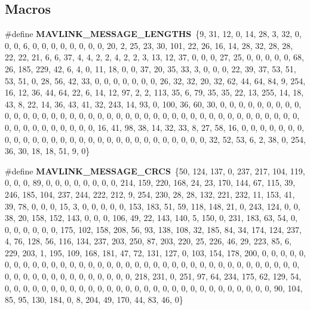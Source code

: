 \subsection*{Macros}
\begin{DoxyCompactItemize}
\item 
\#define \textbf{ M\+A\+V\+L\+I\+N\+K\+\_\+\+M\+E\+S\+S\+A\+G\+E\+\_\+\+L\+E\+N\+G\+T\+HS}~\{9, 31, 12, 0, 14, 28, 3, 32, 0, 0, 0, 6, 0, 0, 0, 0, 0, 0, 0, 0, 20, 2, 25, 23, 30, 101, 22, 26, 16, 14, 28, 32, 28, 28, 22, 22, 21, 6, 6, 37, 4, 4, 2, 2, 4, 2, 2, 3, 13, 12, 37, 0, 0, 0, 27, 25, 0, 0, 0, 0, 0, 68, 26, 185, 229, 42, 6, 4, 0, 11, 18, 0, 0, 37, 20, 35, 33, 3, 0, 0, 0, 22, 39, 37, 53, 51, 53, 51, 0, 28, 56, 42, 33, 0, 0, 0, 0, 0, 0, 0, 26, 32, 32, 20, 32, 62, 44, 64, 84, 9, 254, 16, 12, 36, 44, 64, 22, 6, 14, 12, 97, 2, 2, 113, 35, 6, 79, 35, 35, 22, 13, 255, 14, 18, 43, 8, 22, 14, 36, 43, 41, 32, 243, 14, 93, 0, 100, 36, 60, 30, 0, 0, 0, 0, 0, 0, 0, 0, 0, 0, 0, 0, 0, 0, 0, 0, 0, 0, 0, 0, 0, 0, 0, 0, 0, 0, 0, 0, 0, 0, 0, 0, 0, 0, 0, 0, 0, 0, 0, 0, 0, 0, 0, 0, 0, 0, 0, 0, 0, 0, 0, 16, 41, 98, 38, 14, 32, 33, 8, 27, 58, 16, 0, 0, 0, 0, 0, 0, 0, 0, 0, 0, 0, 0, 0, 0, 0, 0, 0, 0, 0, 0, 0, 0, 0, 0, 0, 0, 0, 0, 0, 32, 52, 53, 6, 2, 38, 0, 254, 36, 30, 18, 18, 51, 9, 0\}
\item 
\#define \textbf{ M\+A\+V\+L\+I\+N\+K\+\_\+\+M\+E\+S\+S\+A\+G\+E\+\_\+\+C\+R\+CS}~\{50, 124, 137, 0, 237, 217, 104, 119, 0, 0, 0, 89, 0, 0, 0, 0, 0, 0, 0, 0, 214, 159, 220, 168, 24, 23, 170, 144, 67, 115, 39, 246, 185, 104, 237, 244, 222, 212, 9, 254, 230, 28, 28, 132, 221, 232, 11, 153, 41, 39, 78, 0, 0, 0, 15, 3, 0, 0, 0, 0, 0, 153, 183, 51, 59, 118, 148, 21, 0, 243, 124, 0, 0, 38, 20, 158, 152, 143, 0, 0, 0, 106, 49, 22, 143, 140, 5, 150, 0, 231, 183, 63, 54, 0, 0, 0, 0, 0, 0, 0, 175, 102, 158, 208, 56, 93, 138, 108, 32, 185, 84, 34, 174, 124, 237, 4, 76, 128, 56, 116, 134, 237, 203, 250, 87, 203, 220, 25, 226, 46, 29, 223, 85, 6, 229, 203, 1, 195, 109, 168, 181, 47, 72, 131, 127, 0, 103, 154, 178, 200, 0, 0, 0, 0, 0, 0, 0, 0, 0, 0, 0, 0, 0, 0, 0, 0, 0, 0, 0, 0, 0, 0, 0, 0, 0, 0, 0, 0, 0, 0, 0, 0, 0, 0, 0, 0, 0, 0, 0, 0, 0, 0, 0, 0, 0, 0, 0, 0, 0, 0, 0, 218, 231, 0, 251, 97, 64, 234, 175, 62, 129, 54, 0, 0, 0, 0, 0, 0, 0, 0, 0, 0, 0, 0, 0, 0, 0, 0, 0, 0, 0, 0, 0, 0, 0, 0, 0, 0, 0, 0, 0, 90, 104, 85, 95, 130, 184, 0, 8, 204, 49, 170, 44, 83, 46, 0\}
\item 

\end{DoxyCompactItemize}
